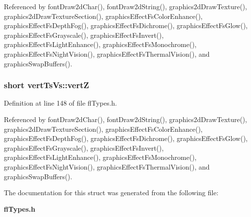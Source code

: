 Referenced by font\-Draw2d\-Char(), font\-Draw2d\-String(), graphics2d\-Draw\-Texture(), graphics2d\-Draw\-Texture\-Section(), graphics\-Effect\-Fs\-Color\-Enhance(), graphics\-Effect\-Fs\-Depth\-Fog(), graphics\-Effect\-Fs\-Dichrome(), graphics\-Effect\-Fs\-Glow(), graphics\-Effect\-Fs\-Grayscale(), graphics\-Effect\-Fs\-Invert(), graphics\-Effect\-Fs\-Light\-Enhance(), graphics\-Effect\-Fs\-Monochrome(), graphics\-Effect\-Fs\-Night\-Vision(), graphics\-Effect\-Fs\-Thermal\-Vision(), and graphics\-Swap\-Buffers().
\subsubsection{\setlength{\rightskip}{0pt plus 5cm}short {\bf vert\-Ts\-Vs::vert\-Z}}\label{structvertTsVs_445ad11bb89226ca03e5d2233f0b760e}




Definition at line 148 of file fl\-Types.h.

Referenced by font\-Draw2d\-Char(), font\-Draw2d\-String(), graphics2d\-Draw\-Texture(), graphics2d\-Draw\-Texture\-Section(), graphics\-Effect\-Fs\-Color\-Enhance(), graphics\-Effect\-Fs\-Depth\-Fog(), graphics\-Effect\-Fs\-Dichrome(), graphics\-Effect\-Fs\-Glow(), graphics\-Effect\-Fs\-Grayscale(), graphics\-Effect\-Fs\-Invert(), graphics\-Effect\-Fs\-Light\-Enhance(), graphics\-Effect\-Fs\-Monochrome(), graphics\-Effect\-Fs\-Night\-Vision(), graphics\-Effect\-Fs\-Thermal\-Vision(), and graphics\-Swap\-Buffers().

The documentation for this struct was generated from the following file:\begin{CompactItemize}
\item 
{\bf fl\-Types.h}\end{CompactItemize}
